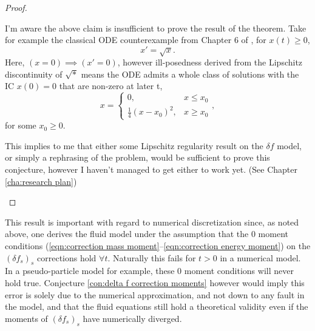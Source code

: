 \begin{proof}
\begin{enumerate}
            \begin{remark}
                I'm aware the above claim is insufficient to prove the result of the theorem. Take for example the classical ODE counterexample from Chapter 6 of \cite{Robinson_2004}, for $x(t)  \geq  0$,
                \begin{equation}
                    x'  =  \sqrt{x}.
                \end{equation}
                Here, $(x = 0)  \implies  (x'  =  0)$, however ill-posedness derived from the Lipschitz discontinuity of $\sqrt{*}$ means the ODE admits a whole class of solutions with the IC $x(0) = 0$ that are non-zero at later t,
                \begin{equation}
                    x  =  \left\{\begin{matrix}
                        0,                           &  x \leq x_{0}  \\ 
                        \frac{1}{4}(x - x_{0})^{2},  &  x \geq x_{0}
                    \end{matrix}\right.,
                \end{equation}
                for some $x_{0}  \geq  0$.
                
                This implies to me that either some Lipschitz regularity result on the $\delta\!f$ model, or simply a rephrasing of the problem, would be sufficient to prove this conjecture, however I haven't managed to get either to work yet. (See Chapter \ref{cha:research plan})
            \end{remark}
        \end{enumerate}
    \end{proof}

    This result is important with regard to numerical discretization since, as noted above, one derives the fluid model under the assumption that the 0 moment conditions (\ref{eqn:correction mass moment}--\ref{eqn:correction energy moment}) on the $(\delta\!f_{s})_{s}$ corrections hold $\forall t$. Naturally this fails for $t > 0$ in a numerical model. In a pseudo-particle model for example, these 0 moment conditions will never hold true. Conjecture \ref{con:delta f correction moments} however would imply this error is solely due to the numerical approximation, and not down to any fault in the model, and that the fluid equations still hold a theoretical validity even if the moments of $(\delta\!f_{s})_{s}$ have numerically diverged. 

